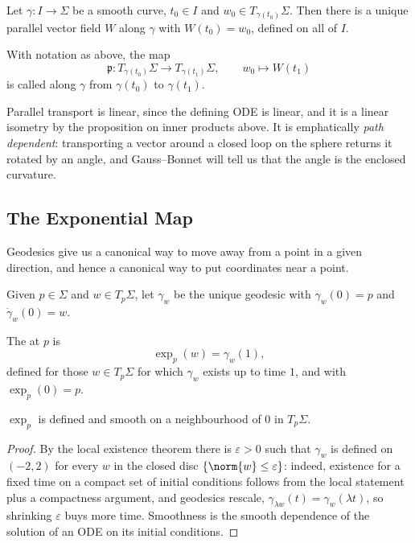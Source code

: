 \documentclass[a4paper]{scrartcl}
\begin{document}
\begin{proposition}
    Let $\gamma: I \rightarrow \Sigma$ be a smooth curve, $t_0 \in I$ and $w_0 \in T_{\gamma(t_0)}\Sigma$. Then there is a unique parallel vector field $W$ along $\gamma$ with $W(t_0) = w_0$, defined on all of $I$.
\end{proposition}

\begin{definition}
    With notation as above, the map
    $$
    \mathfrak{p}: T_{\gamma(t_0)}\Sigma \rightarrow T_{\gamma(t_1)}\Sigma, \qquad w_0 \mapsto W(t_1)
    $$
    is called  along $\gamma$ from $\gamma(t_0)$ to $\gamma(t_1)$.
\end{definition}

Parallel transport is linear, since the defining ODE is linear, and it is a linear isometry by the proposition on inner products above. It is emphatically \emph{path dependent}: transporting a vector around a closed loop on the sphere returns it rotated by an angle, and Gauss--Bonnet will tell us that the angle is the enclosed curvature.

\subsection{The Exponential Map}

Geodesics give us a canonical way to move away from a point in a given direction, and hence a canonical way to put coordinates near a point.

Given $p \in \Sigma$ and $w \in T_p\Sigma$, let $\gamma_w$ be the unique geodesic with $\gamma_w(0) = p$ and $\dot\gamma_w(0) = w$.

\begin{definition}
    The  at $p$ is
    $$
    \exp_p(w) = \gamma_w(1),
    $$
    defined for those $w \in T_p\Sigma$ for which $\gamma_w$ exists up to time $1$, and with $\exp_p(0) = p$.
\end{definition}

\begin{proposition}
    $\exp_p$ is defined and smooth on a neighbourhood of $0$ in $T_p\Sigma$.
\end{proposition}
\begin{proof}
    By the local existence theorem there is $\varepsilon > 0$ such that $\gamma_w$ is defined on $(-2, 2)$ for every $w$ in the closed disc $\{\norm{w} \leq \varepsilon\}$: indeed, existence for a fixed time on a compact set of initial conditions follows from the local statement plus a compactness argument, and geodesics rescale, $\gamma_{\lambda w}(t) = \gamma_w(\lambda t)$, so shrinking $\varepsilon$ buys more time. Smoothness is the smooth dependence of the solution of an ODE on its initial conditions.
\end{proof}
\end{document}
